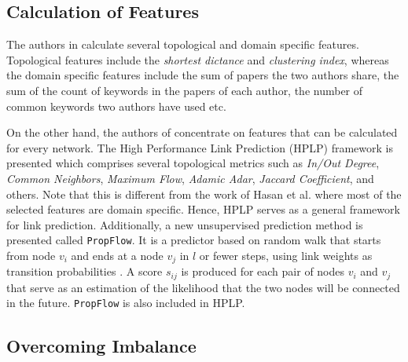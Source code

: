 \documentclass{acm_proc_article-sp}
\begin{document}
\subsection{Calculation of Features}

The authors in \cite{Hasan06linkprediction} calculate several topological and domain specific features. Topological features include the \textit{shortest dictance} and \textit{clustering index}, whereas the domain specific features include the sum of papers the two authors share, the sum of the count of keywords in the papers of each author, the number of common keywords two authors have used etc. 

On the other hand, the authors of \cite{Lichtenwalter:2010:NPM:1835804.1835837} concentrate on features that can be calculated for every network. The High Performance Link Prediction (HPLP) framework is presented which comprises several topological metrics such as \textit{In/Out Degree}, \textit{Common Neighbors}, \textit{Maximum Flow}, \textit{Adamic Adar}, \textit{Jaccard Coefficient}, and others. Note that this is different from the work of Hasan et al. \cite{Hasan06linkprediction} where most of the selected features are domain specific. Hence, HPLP serves as a general framework for link prediction. Additionally, a new unsupervised prediction method is presented called \texttt{PropFlow}. It is a predictor based on random walk that starts from node $v_i$ and ends at a node $v_j$ in $l$ or fewer steps, using link weights as transition probabilities \cite{Lichtenwalter:2010:NPM:1835804.1835837}. A score $s_{ij}$ is produced for each pair of nodes $v_i$ and $v_j$ that serve as an estimation of the likelihood that the two nodes will be connected in the future. \texttt{PropFlow} is also included in HPLP.


\subsection{Overcoming Imbalance}
\end{document}
